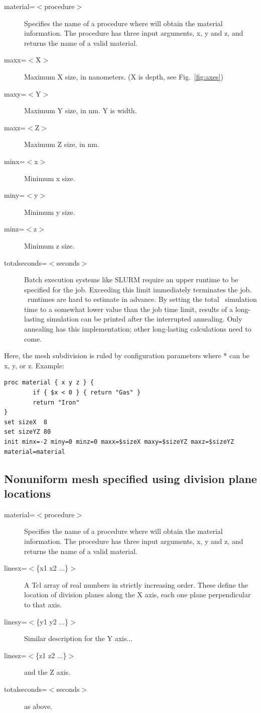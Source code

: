 \begin{description}
\item [material=$<$procedure$>$] Specifies the name of a procedure where \MMonCa{} will obtain the material information. The procedure has three input arguments, x, y and z, and returns the name of a valid material.
\item [maxx=$<$X$>$] Maximum X size, in nanometers. (X is depth, see Fig.~\ref{fig:axes})
\item [maxy=$<$Y$>$] Maximum Y size, in nm. Y is width.
\item [maxz=$<$Z$>$] Maximum Z size, in nm.
\item [minx=$<$x$>$] Minimum x size.
\item [miny=$<$y$>$] Minimum y size.
\item [minz=$<$z$>$] Minimum z size.
\item [totalseconds=$<$seconds$>$] Batch execution systems like SLURM require an upper runtime to be specified for the job. Exceeding this limit immediately terminates the job. \MMonCa\ runtimes are hard to estimate in advance. By setting the total \MMonCa\ simulation time to a somewhat lower value than the job time limit, results of a long-lasting simulation can be printed after the interrupted annealing. Only annealing has this implementation; other long-lasting calculations need to come.
\end{description}

Here, the mesh subdivision is ruled by configuration parameters  where * can be x, y, or z. Example:

\begin{lstlisting}
proc material { x y z } {
        if { $x < 0 } { return "Gas" }
        return "Iron"
}
set sizeX  8
set sizeYZ 80
init minx=-2 miny=0 minz=0 maxx=$sizeX maxy=$sizeYZ maxz=$sizeYZ material=material
\end{lstlisting}

\subsection{Nonuniform mesh specified using division plane locations}

\begin{description}
\item [material=$<$procedure$>$] Specifies the name of a procedure where \MMonCa{} will obtain the material information. The procedure has three input arguments, x, y and z, and returns the name of a valid material.
\item [linesx=$<$\{x1 x2 ...\}$>$] A Tcl array of real numbers in strictly increasing order. These define the location of division planes along the X axis, each one plane perpendicular to that axis.
\item [linesy=$<$\{y1 y2 ...\}$>$] Similar description for the Y axis...
\item [linesz=$<$\{z1 z2 ...\}$>$] and the Z axis.
\item [totalseconds=$<$seconds$>$] as above.
\end{description}

